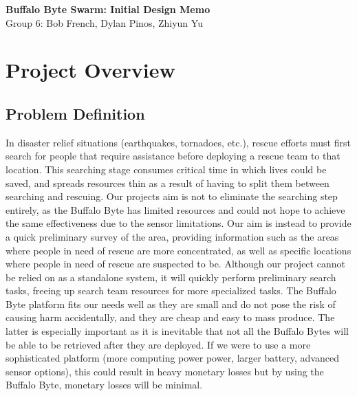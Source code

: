 \documentclass[10pt]{article}
\begin{document}
\begin{center}
	\Large\textbf{Buffalo Byte Swarm: Initial Design Memo}\\[0.1in]
	\large Group 6: Bob French, Dylan Pinos, Zhiyun Yu
\end{center}

\section*{Project Overview}
\subsection*{Problem Definition}
In disaster relief situations (earthquakes, tornadoes, etc.), rescue efforts must first search for people that require assistance before deploying a rescue team to that location. This searching stage consumes critical time in which lives could be saved, and spreads resources thin as a result of having to split them between searching and rescuing. Our projects aim is not to eliminate the searching step entirely, as the Buffalo Byte has limited resources and could not hope to achieve the same effectiveness due to the sensor limitations. Our aim is instead to provide a quick preliminary survey of the area, providing information such as the areas where people in need of rescue are more concentrated, as well as specific locations where people in need of rescue are suspected to be. Although our project cannot be relied on as a standalone system, it will quickly perform preliminary search tasks, freeing up search team resources for more specialized tasks. The Buffalo Byte platform fits our needs well as they are small and do not pose the risk of causing harm accidentally, and they are cheap and easy to mass produce. The latter is especially important as it is inevitable that not all the Buffalo Bytes will be able to be retrieved after they are deployed. If we were to use a more sophisticated platform (more computing power power, larger battery, advanced sensor options), this could result in heavy monetary losses but by using the Buffalo Byte, monetary losses will be minimal.
\end{document}
